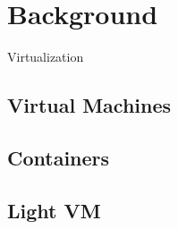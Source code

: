 \section{Background}
\label{sec:background}
%
Virtualization

\subsection{Virtual Machines}

\subsection{Containers}

\subsection{Light VM}
%
